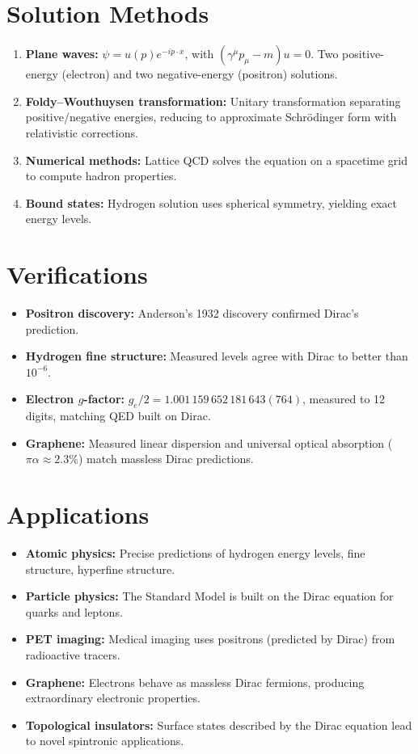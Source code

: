 \documentclass[11pt,openright]{book}
\begin{document}
\section*{Solution Methods}

\begin{enumerate}
\item \textbf{Plane waves:} $\psi = u(p) e^{-ip \cdot x}$, with $(\gamma^\mu p_\mu - m) u = 0$. Two positive-energy (electron) and two negative-energy (positron) solutions.
\item \textbf{Foldy--Wouthuysen transformation:} Unitary transformation separating positive/negative energies, reducing to approximate Schr\"odinger form with relativistic corrections.
\item \textbf{Numerical methods:} Lattice QCD solves the equation on a spacetime grid to compute hadron properties.
\item \textbf{Bound states:} Hydrogen solution uses spherical symmetry, yielding exact energy levels.
\end{enumerate}
\section*{Verifications}

\begin{itemize}
\item \textbf{Positron discovery:} Anderson's 1932 discovery confirmed Dirac's prediction.
\item \textbf{Hydrogen fine structure:} Measured levels agree with Dirac to better than $10^{-6}$.
\item \textbf{Electron $g$-factor:} $g_e/2 = 1.001\,159\,652\,181\,643(764)$, measured to 12 digits, matching QED built on Dirac.
\item \textbf{Graphene:} Measured linear dispersion and universal optical absorption ($\pi\alpha \approx 2.3\%$) match massless Dirac predictions.
\end{itemize}
\section*{Applications}

\begin{itemize}
\item \textbf{Atomic physics:} Precise predictions of hydrogen energy levels, fine structure, hyperfine structure.
\item \textbf{Particle physics:} The Standard Model is built on the Dirac equation for quarks and leptons.
\item \textbf{PET imaging:} Medical imaging uses positrons (predicted by Dirac) from radioactive tracers.
\item \textbf{Graphene:} Electrons behave as massless Dirac fermions, producing extraordinary electronic properties.
\item \textbf{Topological insulators:} Surface states described by the Dirac equation lead to novel spintronic applications.
\end{itemize}
\end{document}
